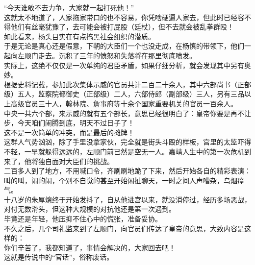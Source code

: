 \begin{multicols}{\theparacolNo}
“今天谁敢不去力争，大家就一起打死他！”\\

这就太不地道了，人家拖家带口的也不容易，你凭啥硬逼人家去，但此时已经容不得他们有丝毫犹豫了，去可能会被打屁股（廷杖），但不去就会被乱拳群殴！\\

如此看来，杨头目实在有点搞黑社会组织的潜质。\\

于是无论是真心还是假意，下朝的大臣们一个也没走成，在杨慎的带领下，他们一起向左顺门走去。沉积了三年的愤怒和失落将在那里彻底喷发。\\

实际上，这绝不仅仅是一次单纯的君臣矛盾，如果仔细分析，就会发现其中另有奥妙。\\

根据史料记载，参加此次集体示威的官员共计二百二十余人，其中六部尚书（正部级）五人，监察院都御史（正部级）二人，六部侍郎（副部级）三人，另有三品以上高级官员三十人，翰林院、詹事府等十余个国家重要机关的官员一百余人。\\

中央一共六个部，来示威的就有五个部长，意思已经很明白了：皇帝你要是再不让步，今天咱们闹腾到底，明天不过日子了！\\

这不是一次简单的冲突，而是最后的摊牌！\\

这群人气势汹汹，除了手里没拿家伙，完全就是街头斗殴的样板，宫里的太监吓得不轻，一早就躲得远远的，左顺门前已然是空无一人。嘉靖人生中的第一次危机到来了，他将独自面对大臣们的挑战。\\

二百多人到了地方，不用喊口令，齐刷刷地跪了下来，然后开始各自的精彩表演：叫的叫，闹的闹，个别不自觉的甚至开始闲扯聊天，一时之间人声嘈杂，乌烟瘴气。\\

十八岁的朱厚熜终于开始发抖了，自从他进宫以来，就没消停过，经历多场恶战，对付无数滑头，但这种大规模的对抗他还是第一次遇到。\\

毕竟还是年轻，他压抑不住心中的慌张，准备妥协。\\

不久之后，几个司礼监来到了左顺门，向官员们传达了皇帝的意思，大致内容是这样的：\\

你们辛苦了，我都知道了，事情会解决的，大家回去吧！\\

这就是传说中的“官话”，俗称废话。\\


\end{multicols}
